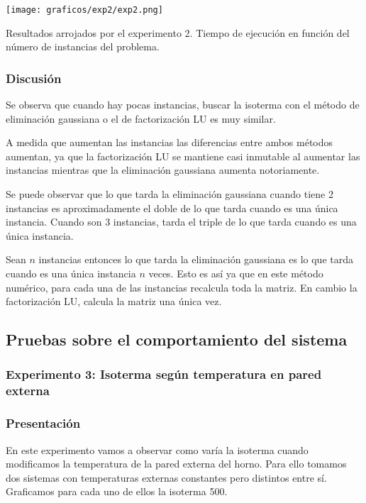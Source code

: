         \begin{minipage}{\textwidth} \begin{center}
          \texttt{[image: graficos/exp2/exp2.png]}

          {\small Resultados arrojados por el experimento 2. Tiempo de ejecución en función del número de instancias del problema.}
        \end{center} \end{minipage}

      \subsubsection*{Discusión}
        Se observa que cuando hay pocas instancias, buscar la isoterma con el método de eliminación gaussiana o el de factorización LU es muy similar. 

        A medida que aumentan las instancias las diferencias entre ambos métodos aumentan, ya que la factorización LU se mantiene casi inmutable al aumentar las instancias mientras que la eliminación gaussiana aumenta notoriamente. 

        Se puede observar que lo que tarda la eliminación gaussiana cuando tiene 2 instancias es aproximadamente el doble de lo que tarda cuando es una única instancia. Cuando son 3 instancias, tarda el triple de lo que tarda cuando es una única instancia. 

        Sean $n$ instancias entonces lo que tarda la eliminación gaussiana es lo que tarda cuando es una única instancia $n$ veces. Esto es así ya que en este método numérico, para cada una de las instancias recalcula toda la matriz. En cambio la factorización LU, calcula la matriz una única vez.

  \subsection{Pruebas sobre el comportamiento del sistema}

    \subsubsection{Experimento 3: Isoterma según temperatura en pared externa} 
        
      \subsubsection*{Presentación}
        En este experimento vamos a observar como varía la isoterma cuando modificamos la temperatura de la pared externa del horno. Para ello tomamos dos sistemas con temperaturas externas constantes pero distintos entre sí. Graficamos para cada uno de ellos la isoterma 500. 
        
